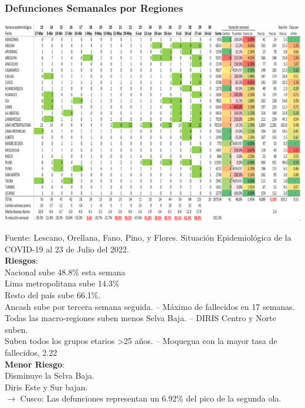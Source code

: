 \documentclass[xcolor=table]{beamer}
\begin{document}
\begin{frame}
	\frametitle{Defunciones Semanales por Regiones}
\vspace{-.2cm}
\begin{center}
	\includegraphics[width=0.55\linewidth]{../sala_nacional/defunciones_regional.png}
\end{center}
{\tiny Fuente: Lescano, Orellana, Fano, Pino, y Flores. Situación Epidemiológica de la COVID-19 al 23 de Julio del 2022.\\
\textbf{Riesgos}:\\
			Nacional sube 48.8\% esta semana\\
			Lima metropolitana sube 14.3\%\\
			Resto del país sube 66.1\%.\\
			Ancash sube por tercera semana seguida. -- Máximo de fallecidos en 17 semanas.\\
			Todas las macro-regiones suben menos Selva Baja. -- DIRIS Centro y Norte suben.\\
			Suben todos los grupos etarios >25 años. -- Moquegua con la mayor tasa de fallecidos, 2.22\\		
\textbf{Menor Riesgo}: \\
			Disminuye la Selva Baja.\\	
			Diris Este y Sur bajan.\\	
			}
\vspace{0.01cm}
$\rightarrow$ {\color{mycolor5}Cusco}: Las defunciones representan un $6.92\% $ del pico de la segunda ola.\\
\end{frame}
	
\end{document}
